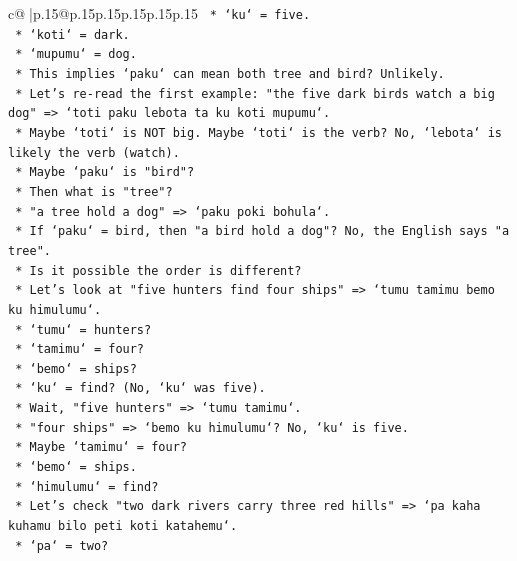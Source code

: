 \documentclass{article}
\begin{document}
{\begin{supertabular}{c@{$\;$}|p{.15\linewidth}@{}p{.15\linewidth}p{.15\linewidth}p{.15\linewidth}p{.15\linewidth}p{.15\linewidth}}
{{{\texttt{                *   `ku` = five.} \\
\texttt{                *   `koti` = dark.} \\
\texttt{                *   `mupumu` = dog.} \\
\texttt{            *   This implies `paku` can mean both tree and bird? Unlikely.} \\
\texttt{            *   Let's re{-}read the first example: "the five dark birds watch a big dog" => `toti paku lebota ta ku koti mupumu`.} \\
\texttt{                *   Maybe `toti` is NOT big. Maybe `toti` is the verb? No, `lebota` is likely the verb (watch).} \\
\texttt{                *   Maybe `paku` is "bird"?} \\
\texttt{                *   Then what is "tree"?} \\
\texttt{                *   "a tree hold a dog" => `paku poki bohula`.} \\
\texttt{                *   If `paku` = bird, then "a bird hold a dog"? No, the English says "a tree".} \\
\texttt{                *   Is it possible the order is different?} \\
\texttt{                *   Let's look at "five hunters find four ships" => `tumu tamimu bemo ku himulumu`.} \\
\texttt{                    *   `tumu` = hunters?} \\
\texttt{                    *   `tamimu` = four?} \\
\texttt{                    *   `bemo` = ships?} \\
\texttt{                    *   `ku` = find? (No, `ku` was five).} \\
\texttt{                    *   Wait, "five hunters" => `tumu tamimu`.} \\
\texttt{                    *   "four ships" => `bemo ku himulumu`? No, `ku` is five.} \\
\texttt{                    *   Maybe `tamimu` = four?} \\
\texttt{                    *   `bemo` = ships.} \\
\texttt{                    *   `himulumu` = find?} \\
\texttt{                *   Let's check "two dark rivers carry three red hills" => `pa kaha kuhamu bilo peti koti katahemu`.} \\
\texttt{                    *   `pa` = two?} \\
}}}
\end{supertabular}}
\end{document}
